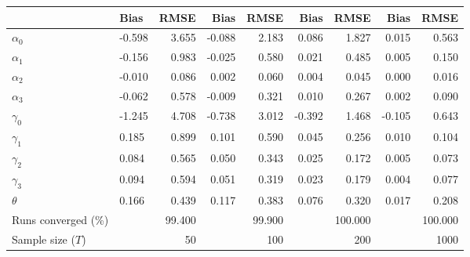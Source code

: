 
\begin{tabular}[t]{llrrrrrrr}
\toprule
  & Bias & RMSE & Bias & RMSE & Bias & RMSE & Bias & RMSE\\
\midrule
$\alpha_{0}$ & -0.598 & 3.655 & -0.088 & 2.183 & 0.086 & 1.827 & 0.015 & 0.563\\
$\alpha_{1}$ & -0.156 & 0.983 & -0.025 & 0.580 & 0.021 & 0.485 & 0.005 & 0.150\\
$\alpha_{2}$ & -0.010 & 0.086 & 0.002 & 0.060 & 0.004 & 0.045 & 0.000 & 0.016\\
$\alpha_{3}$ & -0.062 & 0.578 & -0.009 & 0.321 & 0.010 & 0.267 & 0.002 & 0.090\\
$\gamma_{0}$ & -1.245 & 4.708 & -0.738 & 3.012 & -0.392 & 1.468 & -0.105 & 0.643\\
$\gamma_{1}$ & 0.185 & 0.899 & 0.101 & 0.590 & 0.045 & 0.256 & 0.010 & 0.104\\
$\gamma_{2}$ & 0.084 & 0.565 & 0.050 & 0.343 & 0.025 & 0.172 & 0.005 & 0.073\\
$\gamma_{3}$ & 0.094 & 0.594 & 0.051 & 0.319 & 0.023 & 0.179 & 0.004 & 0.077\\
$\theta$ & 0.166 & 0.439 & 0.117 & 0.383 & 0.076 & 0.320 & 0.017 & 0.208\\
Runs converged (\%) &  & 99.400 &  & 99.900 &  & 100.000 &  & 100.000\\
Sample size ($T$) &  & 50 &  & 100 &  & 200 &  & 1000\\
\bottomrule
\end{tabular}
